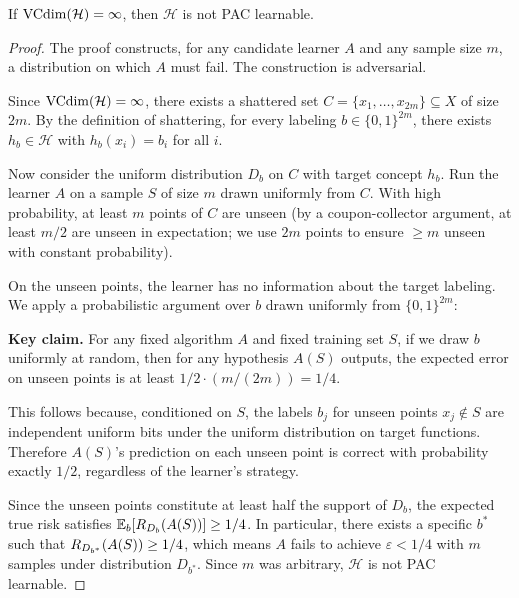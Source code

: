 \begin{thm}
\label{thm:vc-converse}
If $\mathrm{VCdim}(\mathcal{H}) = \infty$, then $\mathcal{H}$ is not PAC learnable.
\end{thm}

\begin{proof}
The proof constructs, for any candidate learner $A$ and any sample size $m$,
a distribution on which $A$ must fail.  The construction is adversarial.

Since $\mathrm{VCdim}(\mathcal{H}) = \infty$, there exists a shattered set
$C = \{x_1, \ldots, x_{2m}\} \subseteq X$ of size $2m$.  By the definition of
shattering, for every labeling $b \in \{0,1\}^{2m}$, there exists
$h_b \in \mathcal{H}$ with $h_b(x_i) = b_i$ for all $i$.

Now consider the uniform distribution $D_b$ on $C$ with target concept $h_b$.
Run the learner $A$ on a sample $S$ of size $m$ drawn uniformly from $C$.
With high probability, at least $m$ points of $C$ are unseen
(by a coupon-collector argument, at least $m/2$ are unseen in expectation; we
use $2m$ points to ensure $\geq m$ unseen with constant probability).

On the unseen points, the learner has no information about the target labeling.
We apply a probabilistic argument over $b$ drawn uniformly from $\{0,1\}^{2m}$:

\medskip
\noindent\textbf{Key claim.}  For any fixed algorithm $A$ and fixed training
set $S$, if we draw $b$ uniformly at random, then for any hypothesis $A(S)$
outputs, the expected error on unseen points is at least $1/2 \cdot (m/(2m))
= 1/4$.

This follows because, conditioned on $S$, the labels $b_j$ for unseen points
$x_j \notin S$ are independent uniform bits under the uniform distribution on
target functions.  Therefore $A(S)$'s prediction on each unseen point is
correct with probability exactly $1/2$, regardless of the learner's strategy.

Since the unseen points constitute at least half the support of $D_b$, the
expected true risk satisfies $\mathbb{E}_b[R_{D_b}(A(S))] \geq 1/4$.  In
particular, there exists a specific $b^*$ such that
$R_{D_{b^*}}(A(S)) \geq 1/4$, which means $A$ fails to achieve
$\varepsilon < 1/4$ with $m$ samples under distribution $D_{b^*}$.  Since $m$
was arbitrary, $\mathcal{H}$ is not PAC learnable.
\end{proof}

